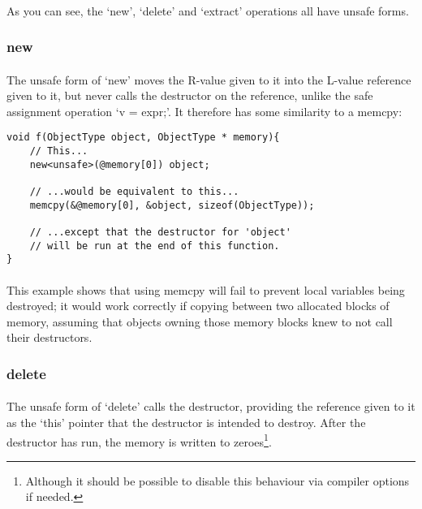 \documentclass[12pt,twoside,notitlepage]{report}
\begin{document}
\paragraph{}
As you can see, the `new', `delete' and `extract' operations all have unsafe forms.

\subsubsection{new}

\paragraph{}
The unsafe form of `new' moves the R-value given to it into the L-value reference given to it, but never calls the destructor on the reference, unlike the safe assignment operation `v = expr;'. It therefore has some similarity to a memcpy:

\begin{lstlisting}
void f(ObjectType object, ObjectType * memory){
	// This...
	new<unsafe>(@memory[0]) object;
	
	// ...would be equivalent to this...
	memcpy(&@memory[0], &object, sizeof(ObjectType));
	
	// ...except that the destructor for 'object'
	// will be run at the end of this function.
}
\end{lstlisting}

\paragraph{}
This example shows that using memcpy will fail to prevent local variables being destroyed; it would work correctly if copying between two allocated blocks of memory, assuming that objects owning those memory blocks knew to not call their destructors.

\subsubsection{delete}

\paragraph{}
The unsafe form of `delete' calls the destructor, providing the reference given to it as the `this' pointer that the destructor is intended to destroy. After the destructor has run, the memory is written to zeroes\footnote{Although it should be possible to disable this behaviour via compiler options if needed.}.
\end{document}
